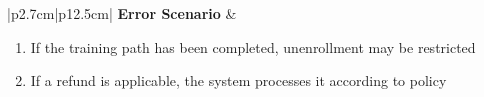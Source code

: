 \begin{table}[H]
\begin{tabular}{|p{2.7cm}|p{12.5cm}|}
            \hline
            \textbf{Error Scenario} & \begin{minipage}[t]{\linewidth}
                                          \begin{enumerate}[topsep=0pt,itemsep=1pt,parsep=0pt,partopsep=0pt]
                                              \item If the training path has been completed, unenrollment may be restricted
                                              \item If a refund is applicable, the system processes it according to policy
                                          \end{enumerate}
                                      \end{minipage}      \\
            \hline
        \end{tabular}
        \label{tab:eng-unenroll}
    \end{table}
